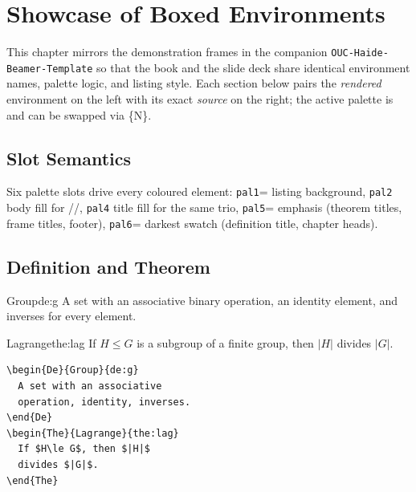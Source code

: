 
\chapter{Showcase of Boxed Environments}
\label{ch:showcase}

This chapter mirrors the demonstration frames in the companion
\texttt{OUC-Haide-Beamer-Template} so that the book and the slide deck share
identical environment names, palette logic, and listing style.  Each section
below pairs the \emph{rendered} environment on the left with its exact
\emph{source} on the right; the active palette is \texttt{\OUCPaletteName}
and can be swapped via \{N\}.

\section{Slot Semantics}
Six palette slots drive every coloured element:
\texttt{pal1}= listing background,
\texttt{pal2} body fill for //,
\texttt{pal4} title fill for the same trio,
\texttt{pal5}= emphasis (theorem titles, frame titles, footer),
\texttt{pal6}= darkest swatch (definition title, chapter heads).

\section{Definition and Theorem}

\begin{fullwidth}
\begin{minipage}[t]{0.48\linewidth}
\begin{De}{Group}{de:g}
A set with an associative binary operation, an identity element, and inverses
for every element.
\end{De}
\begin{The}{Lagrange}{the:lag}
If $H\le G$ is a subgroup of a finite group, then $|H|$ divides $|G|$.
\end{The}
\end{minipage}\hfill
\begin{minipage}[t]{0.48\linewidth}
\begin{lstlisting}[language={[LaTeX]TeX}]
\begin{De}{Group}{de:g}
  A set with an associative
  operation, identity, inverses.
\end{De}
\begin{The}{Lagrange}{the:lag}
  If $H\le G$, then $|H|$
  divides $|G|$.
\end{The}
\end{lstlisting}
\end{minipage}
\end{fullwidth}

